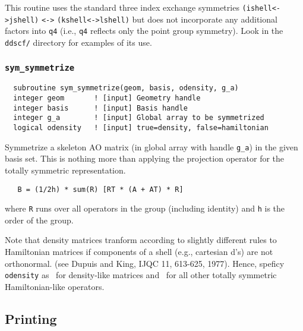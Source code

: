 This routine uses the standard three index exchange symmetries
\verb+(ishell<->jshell)+ \verb+<->+ \verb+(kshell<->lshell)+ but does
not incorporate any additional factors into \verb+q4+ (i.e., \verb+q4+
reflects only the point group symmetry).  Look in the \verb+ddscf/+
directory for examples of its use.

\subsubsection{{\tt sym\_symmetrize}}
\begin{verbatim}
  subroutine sym_symmetrize(geom, basis, odensity, g_a)
  integer geom       ! [input] Geometry handle
  integer basis      ! [input] Basis handle
  integer g_a        ! [input] Global array to be symmetrized
  logical odensity   ! [input] true=density, false=hamiltonian
\end{verbatim}
Symmetrize a skeleton AO matrix (in global array with handle
\verb+g_a+) in the given basis set.  This is nothing more than
applying the projection operator for the totally symmetric
representation.
\begin{verbatim}
   B = (1/2h) * sum(R) [RT * (A + AT) * R]
\end{verbatim}
where \verb+R+ runs over all operators in the group (including
identity) and \verb+h+ is the order of the group.

Note that density matrices tranform according to slightly different
rules to Hamiltonian matrices if components of a shell (e.g.,
cartesian d's) are not orthonormal.  (see Dupuis and King, IJQC 11,
613-625, 1977).  Hence, speficy \verb+odensity+ as \TRUE\ for
density-like matrices and \FALSE\ for all other totally symmetric
Hamiltonian-like operators.

\subsection{Printing}

